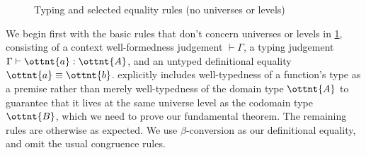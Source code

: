 \documentclass[a4paper,UKenglish,cleveref,autoref,thm-restate]{lipics-v2021}
\begin{document}
\begin{figure}
%

\caption{Typing and selected equality rules (no universes or levels)}
\label{fig:typing:basic}
\end{figure}

We begin first with the basic rules that don't concern universes or levels in \cref{fig:typing:basic},
consisting of a context well-formedness judgement $ \mathop{\vdash}  \Gamma $,
a typing judgement $ \Gamma  \vdash  \ottnt{a}  \mathrel{:}  \ottnt{A} $, and an untyped definitional equality $ \ottnt{a}  \equiv  \ottnt{b} $.
 explicitly includes well-typedness of a function's type as a premise
rather than merely well-typedness of the domain type $\ottnt{A}$
to guarantee that it lives at the same universe level as the codomain type $\ottnt{B}$,
which we need to prove our fundamental theorem.
The remaining rules are otherwise as expected.
We use $\beta$-conversion as our definitional equality,
and omit the usual congruence rules.
\end{document}
